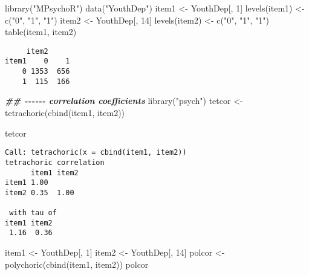 \documentclass[
]{book}
\newenvironment{Shaded}{\begin{snugshade}}{\end{snugshade}}
\newcommand{\DecValTok}[1]{\textcolor[rgb]{0.00,0.00,0.81}{#1}}
\newcommand{\DocumentationTok}[1]{\textcolor[rgb]{0.56,0.35,0.01}{\textbf{\textit{#1}}}}
\newcommand{\FunctionTok}[1]{\textcolor[rgb]{0.00,0.00,0.00}{#1}}
\newcommand{\NormalTok}[1]{#1}
\newcommand{\OtherTok}[1]{\textcolor[rgb]{0.56,0.35,0.01}{#1}}
\newcommand{\StringTok}[1]{\textcolor[rgb]{0.31,0.60,0.02}{#1}}
\begin{document}
\begin{Shaded}
\begin{Highlighting}[]
\FunctionTok{library}\NormalTok{(}\StringTok{"MPsychoR"}\NormalTok{)}
\FunctionTok{data}\NormalTok{(}\StringTok{"YouthDep"}\NormalTok{)}
\NormalTok{item1 }\OtherTok{\textless{}{-}}\NormalTok{ YouthDep[, }\DecValTok{1}\NormalTok{]}
\FunctionTok{levels}\NormalTok{(item1) }\OtherTok{\textless{}{-}} \FunctionTok{c}\NormalTok{(}\StringTok{"0"}\NormalTok{, }\StringTok{"1"}\NormalTok{, }\StringTok{"1"}\NormalTok{)}
\NormalTok{item2 }\OtherTok{\textless{}{-}}\NormalTok{ YouthDep[, }\DecValTok{14}\NormalTok{]}
\FunctionTok{levels}\NormalTok{(item2) }\OtherTok{\textless{}{-}} \FunctionTok{c}\NormalTok{(}\StringTok{"0"}\NormalTok{, }\StringTok{"1"}\NormalTok{, }\StringTok{"1"}\NormalTok{)}
\FunctionTok{table}\NormalTok{(item1, item2)}
\end{Highlighting}
\end{Shaded}

\begin{verbatim}
     item2
item1    0    1
    0 1353  656
    1  115  166
\end{verbatim}

\begin{Shaded}
\begin{Highlighting}[]
\DocumentationTok{\#\# {-}{-}{-}{-}{-}{-} correlation coefficients}
\FunctionTok{library}\NormalTok{(}\StringTok{"psych"}\NormalTok{)}
\NormalTok{tetcor }\OtherTok{\textless{}{-}} \FunctionTok{tetrachoric}\NormalTok{(}\FunctionTok{cbind}\NormalTok{(item1, item2))}
\end{Highlighting}
\end{Shaded}

\begin{Shaded}
\begin{Highlighting}[]
\NormalTok{tetcor}
\end{Highlighting}
\end{Shaded}

\begin{verbatim}
Call: tetrachoric(x = cbind(item1, item2))
tetrachoric correlation 
      item1 item2
item1 1.00       
item2 0.35  1.00 

 with tau of 
item1 item2 
 1.16  0.36 
\end{verbatim}

\begin{Shaded}
\begin{Highlighting}[]
\NormalTok{item1 }\OtherTok{\textless{}{-}}\NormalTok{ YouthDep[, }\DecValTok{1}\NormalTok{]}
\NormalTok{item2 }\OtherTok{\textless{}{-}}\NormalTok{ YouthDep[, }\DecValTok{14}\NormalTok{]}
\NormalTok{polcor }\OtherTok{\textless{}{-}} \FunctionTok{polychoric}\NormalTok{(}\FunctionTok{cbind}\NormalTok{(item1, item2))}
\NormalTok{polcor}
\end{Highlighting}
\end{Shaded}
\end{document}
